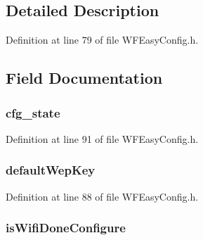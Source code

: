 \subsection{Detailed Description}


Definition at line 79 of file W\+F\+Easy\+Config.\+h.



\subsection{Field Documentation}
\hypertarget{structt_w_f_easy_config_ctx_a626350f48325f53dd789ce68cdaa17ed}{}
\subsubsection[{cfg\+\_\+state}]{ cfg\+\_\+state}\label{structt_w_f_easy_config_ctx_a626350f48325f53dd789ce68cdaa17ed}


Definition at line 91 of file W\+F\+Easy\+Config.\+h.

\hypertarget{structt_w_f_easy_config_ctx_aa1a51be8a8f34df0cb2f7cc221a475d3}{}
\subsubsection[{default\+Wep\+Key}]{ default\+Wep\+Key}\label{structt_w_f_easy_config_ctx_aa1a51be8a8f34df0cb2f7cc221a475d3}


Definition at line 88 of file W\+F\+Easy\+Config.\+h.

\hypertarget{structt_w_f_easy_config_ctx_aae8fb7a47e258b5bc2302599c8458408}{}
\subsubsection[{is\+Wifi\+Done\+Configure}]{ is\+Wifi\+Done\+Configure}\label{structt_w_f_easy_config_ctx_aae8fb7a47e258b5bc2302599c8458408}


